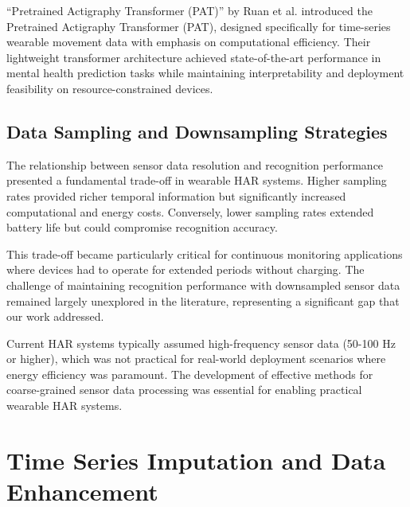 ``Pretrained Actigraphy Transformer (PAT)'' by Ruan et al. \cite{Ruan2024PAT} introduced the Pretrained Actigraphy Transformer (PAT), designed specifically for time-series wearable movement data with emphasis on computational efficiency. Their lightweight transformer architecture achieved state-of-the-art performance in mental health prediction tasks while maintaining interpretability and deployment feasibility on resource-constrained devices.

\subsection{Data Sampling and Downsampling Strategies}

\hspace{2em}The relationship between sensor data resolution and recognition performance presented a fundamental trade-off in wearable HAR systems. Higher sampling rates provided richer temporal information but significantly increased computational and energy costs. Conversely, lower sampling rates extended battery life but could compromise recognition accuracy.

This trade-off became particularly critical for continuous monitoring applications where devices had to operate for extended periods without charging. The challenge of maintaining recognition performance with downsampled sensor data remained largely unexplored in the literature, representing a significant gap that our work addressed.

Current HAR systems typically assumed high-frequency sensor data (50-100 Hz or higher), which was not practical for real-world deployment scenarios where energy efficiency was paramount. The development of effective methods for coarse-grained sensor data processing was essential for enabling practical wearable HAR systems.

\section{Time Series Imputation and Data Enhancement}

